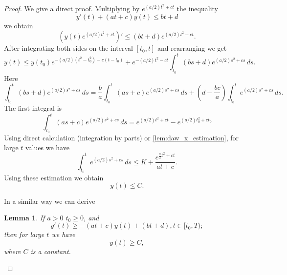\documentclass[pdflatex,sn-mathphys-num]{sn-jnl}
\theoremstyle{thmstyleone}
\newtheorem{lemma}{Lemma}[section]
\theoremstyle{thmstyletwo}
\theoremstyle{thmstylethree}
\begin{document}
\begin{proof}
We give a direct proof. Multiplying by $e^{(a/2)t^2+ct}$ the inequality 
\begin{equation*}
y'(t)+(at+c)y(t)\leq bt+d
\end{equation*}
we obtain
\begin{equation*}
\left(y(t)e^{(a/2)t^2+ct}  \right)'\leq (bt+d)e^{(a/2)t^2+ct}.
\end{equation*}
After integrating both sides on the interval $[t_0,t]$ and rearranging we get
\begin{equation*}
y(t) \le y(t_0) e^{-(a/2)(t^2 - t_0^2) - c(t - t_0)} + e^{-(a/2)t^2 - ct} \int_{t_0}^t (bs + d) 
e^{(a/2)s^2 + cs} \, ds.
\end{equation*}
Here 
\begin{equation*}
\int_{t_0}^t (bs + d) e^{(a/2)s^2 + cs} \, ds = \frac{b}{a} \int_{t_0}^t (as + c) e^{(a/2)s^2 + 
cs} \, ds + \left(d - \frac{bc}{a}\right) \int_{t_0}^t e^{(a/2)s^2 + cs} \, ds. 
\end{equation*}
The first integral is
\begin{equation*}
\int_{t_0}^t (as + c) e^{(a/2)s^2 + cs} \, ds = e^{(a/2)t^2 + ct} - e^{(a/2)t_0^2 + ct_0}
\end{equation*}
Using direct calculation (integration by parts) 
or \autoref{lem:daw_x_estimation}, for large $t$ values we have 
\begin{equation*}
\int_{t_0}^t e^{(a/2)s^2 + cs} \, ds \le K + \frac{e^{\frac{a}{2}t^2 + ct}}{at+c}.
\end{equation*}
Using these estimation we obtain 
\begin{equation*}
    y(t)\leq C.
\end{equation*}

In a similar way we can derive
\begin{lemma}\label{lem:lower_diff_ineq_gen}
If $a>0$ $t_0\geq 0$, and 
\begin{equation*}
y'(t)\geq -(at+c)y(t)+(bt+d),  t\in[t_0,T);
\end{equation*}
then for large $t$ we have
\begin{equation*}
y(t)\geq C,
\end{equation*}
where $C$ is a constant. 
\end{lemma}
\end{proof}
\end{document}
